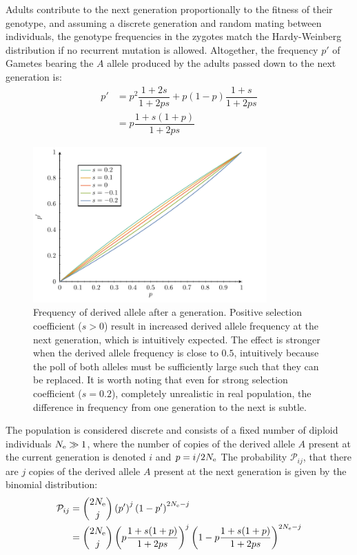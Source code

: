 Adults contribute to the next generation proportionally to the fitness of their genotype, and assuming a discrete generation and random mating between individuals, the genotype frequencies in the zygotes match the Hardy-Weinberg distribution if no recurrent mutation is allowed.
Altogether, the frequency $p'$ of \glspl{Gamete} bearing the $A$ \gls{allele} produced by the adults passed down to the next generation is:
\begin{align}
p' & = p^2 \dfrac{1+2s}{1+2ps} + p(1-p)\dfrac{1+s}{1+2ps}\\
& = p\dfrac{1+s(1+p)}{1 + 2ps}
\end{align}

\begin{figure}[H]
	\centering
	\includegraphics[width=0.8\textwidth, page=1] {figures.pdf}
	\caption[Frequency of derived {allele} after a generation]{
	Frequency of derived \gls{allele} after a generation.
	Positive selection coefficient ($s > 0$) result in increased derived \gls{allele} frequency at the next generation, which is intuitively expected.
	The effect is stronger when the derived \gls{allele} frequency is close to $0.5$, intuitively because the poll of both \glspl{allele} must be sufficiently large such that they can be replaced.
	It is worth noting that even for strong selection coefficient ($s=0.2$), completely unrealistic in real population, the difference in frequency from one generation to the next is subtle.}
\end{figure}

The population is considered discrete and consists of a fixed number of \gls{diploid} individuals $N_{\textrm{e}} \gg 1$, where the number of copies of the derived \gls{allele} $A$ present at the current generation is denoted $i$ and $p=i / 2N_{\textrm{e}} $ 
The probability $\mathcal{P}_{ij}$, that there are $j$ copies of the derived \gls{allele} $A$ present at the next generation is given by the binomial distribution:
\begin{align}
\mathcal{P}_{ij} & = \binom{2 N_{\textrm{e}}}{j} \left( p' \right)^j \left(1 - p' \right)^{2 N_{\textrm{e}} -j} \\
				 & = \binom{2 N_{\textrm{e}}}{j} \left( p\dfrac{1+s(1+p)}{1 + 2ps} \right)^j \left(1 - p\dfrac{1+s(1+p)}{1 + 2ps} \right)^{2 N_{\textrm{e}} -j}
\end{align}

